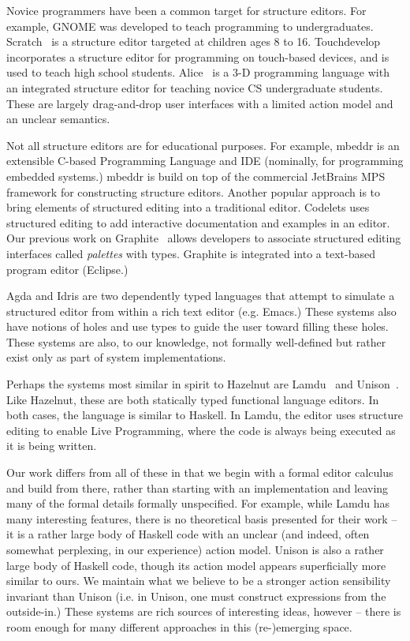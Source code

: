 \documentclass[preprint,9pt]{sigplanconf}
\begin{document}
Novice programmers have been a common target for structure editors. For example,
GNOME\cite{garlan_gnome:_1984} was developed to teach programming to undergraduates.
Scratch~\cite{Resnick:2009:SP:1592761.1592779} is a structure editor targeted at children ages 8 to 16.
Touchdevelop \cite{tillmann_touchdevelop:_2011} incorporates a structure editor for programming on touch-based devices, and is used to teach high school students.
Alice~\cite{Conway:2000:ALL:332040.332481} is a 3-D programming language with an integrated structure editor for teaching novice CS undergraduate students. These are largely drag-and-drop user interfaces with a limited action model and an unclear semantics.

Not all structure editors are for educational purposes. For example,
mbeddr \cite{voelter_mbeddr:_2012} is an extensible C-based Programming Language and IDE (nominally, for programming embedded systems.)
mbeddr is build on top of the commercial JetBrains MPS framework for constructing structure editors.
Another popular approach is to bring elements of structured editing into a traditional editor.
Codelets \cite{oney_codelets:_2012} uses structured editing to add interactive documentation and examples in an editor.
Our previous work on Graphite~\cite{Omar:2012:ACC:2337223.2337324} allows developers to associate structured editing interfaces called  \emph{palettes} with types. Graphite is integrated into a text-based program editor (Eclipse.)

Agda and Idris are two dependently typed languages that attempt to simulate a structured editor from within a rich text editor (e.g. Emacs.) These systems also have notions of holes and use types to guide the user toward filling these holes. These  systems are also, to our knowledge, not formally well-defined but rather exist only as part of system implementations.

Perhaps the systems most similar in spirit to Hazelnut are Lamdu~\cite{lamdu} and Unison~\cite{unison}. Like Hazelnut, these are both statically typed functional language editors. In both cases, the language is similar to Haskell. In Lamdu, the editor uses structure editing to enable Live Programming, where the code is always being executed as it is being written.

Our work differs from all of these in that we begin with a formal editor calculus and build from there, rather than starting with an implementation and leaving many of the formal details formally unspecified. For example, while Lamdu has many interesting features, there is no theoretical basis presented for their work -- it is a rather large body of Haskell code with an unclear (and indeed, often somewhat perplexing, in our experience) action model. Unison is also a rather large body of Haskell code, though its action model appears superficially more similar to ours. We maintain what we believe to be a stronger action sensibility invariant than Unison (i.e. in Unison, one must construct expressions from the outside-in.) These systems are rich sources of interesting ideas, however -- there is room enough for many different approaches in this (re-)emerging space.
\end{document}
